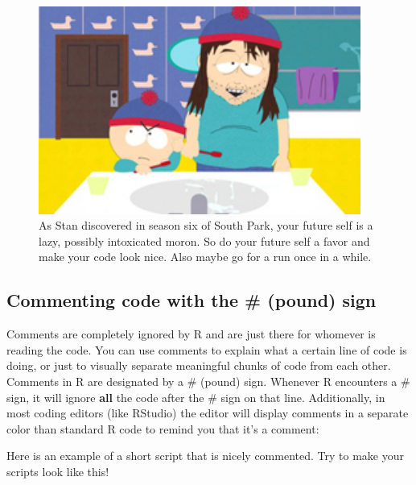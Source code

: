 \documentclass[]{book}
\theoremstyle{definition}
\theoremstyle{definition}
\theoremstyle{remark}
\begin{document}
\begin{figure}

{\centering \includegraphics[width=400px]{images/futureself} 

}

\caption{As Stan discovered in season six of South Park, your future self is a lazy, possibly intoxicated moron. So do your future self a favor and make your code look nice. Also maybe go for a run once in a while.}\label{fig:futureself}
\end{figure}

\subsection{Commenting code with the \# (pound)
sign}\label{commenting-code-with-the-pound-sign}

Comments are completely ignored by R and are just there for whomever is
reading the code. You can use comments to explain what a certain line of
code is doing, or just to visually separate meaningful chunks of code
from each other. Comments in R are designated by a \# (pound) sign.
Whenever R encounters a \# sign, it will ignore \textbf{all} the code
after the \# sign on that line. Additionally, in most coding editors
(like RStudio) the editor will display comments in a separate color than
standard R code to remind you that it's a comment:

Here is an example of a short script that is nicely commented. Try to
make your scripts look like this!
\end{document}
